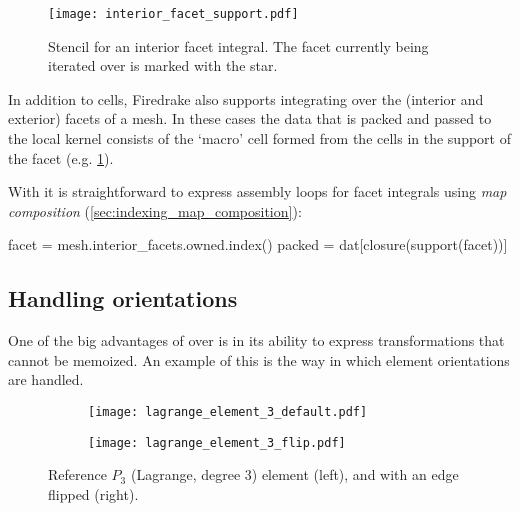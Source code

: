 \documentclass[thesis]{subfiles}
\begin{document}
\begin{figure}
  \centering
  \texttt{[image: interior\_facet\_support.pdf]}
  \caption{
    Stencil for an interior facet integral.
    The facet currently being iterated over is marked with the star.
  }
  \label{fig:interior_facet_support}
\end{figure}

In addition to cells, Firedrake also supports integrating over the (interior and exterior) facets of a mesh.
In these cases the data that is packed and passed to the local kernel consists of the `macro' cell formed from the cells in the support of the facet (e.g. \cref{fig:interior_facet_support}).

With  it is straightforward to express assembly loops for facet integrals using \textit{map composition} (\cref{sec:indexing_map_composition}):

\begin{pyinline}
  facet = mesh.interior_facets.owned.index()
  packed = dat[closure(support(facet))]
\end{pyinline}

\subsection{Handling orientations}

One of the big advantages of  over  is in its ability to express transformations that cannot be memoized.
An example of this is the way in which element orientations are handled.


\begin{figure}
  \centering
  \begin{subfigure}{0.45\textwidth}
    \centering
    \texttt{[image: lagrange\_element\_3\_default.pdf]}
  \end{subfigure}
  \begin{subfigure}{0.45\textwidth}
    \centering
    \texttt{[image: lagrange\_element\_3\_flip.pdf]}
  \end{subfigure}
  \caption{Reference $P_3$ (Lagrange, degree 3) element (left), and with an edge flipped (right).}
  \label{fig:element_orientation_permute}
\end{figure}
\end{document}
